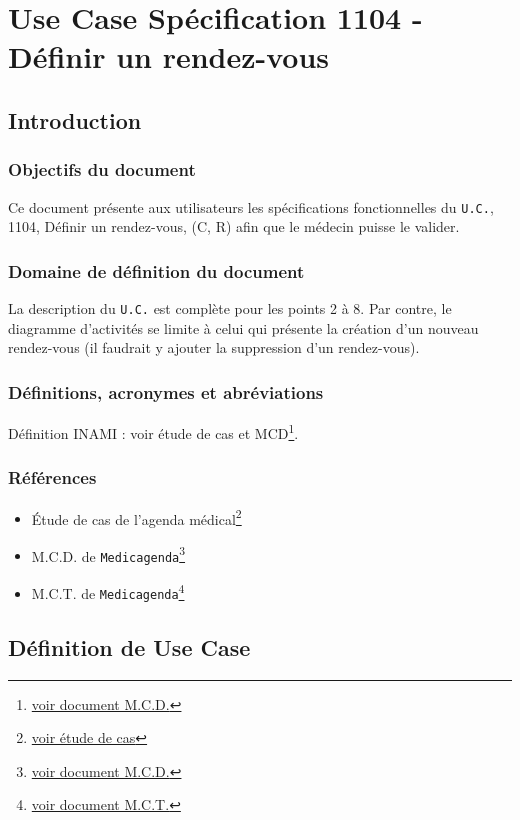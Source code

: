 \chapter{Use Case Spécification 1104 - Définir un rendez-vous}

\section{Introduction}

\subsection{Objectifs du document}
Ce document présente aux utilisateurs les spécifications fonctionnelles du \texttt{U.C.},
1104, Définir un rendez-vous, (C, R) afin que le médecin puisse le valider.

\subsection{Domaine de définition du document}
La description du \texttt{U.C.} est complète pour les points 2 à 8. Par contre, le
diagramme d’activités se limite à celui qui présente la création d’un nouveau 
rendez-vous (il faudrait y ajouter la suppression d’un rendez-vous). 

\subsection{Définitions, acronymes et abréviations}
Définition INAMI : voir étude de cas et MCD\footnote{\href{../MCD/MCD.pdf}{voir document M.C.D.}}.

\subsection{Références}
\begin{itemize}
	\item[] Étude de cas de l'agenda
		médical\footnote{\href{../Enonce_Travail_Synthese_14-15.pdf}{voir
		étude de cas}}
	\item[] M.C.D. de \texttt{Medicagenda}\footnote{\href{../MCD/MCD.pdf}{voir document M.C.D.}}
	\item[] M.C.T. de \texttt{Medicagenda}\footnote{\href{./MCT.pdf}{voir document M.C.T.}}
\end{itemize}
\newpage

\section{Définition de Use Case}
